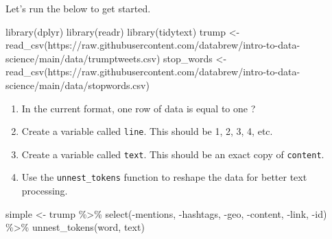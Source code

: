 \documentclass[
]{book}
\newenvironment{Shaded}{\begin{snugshade}}{\end{snugshade}}
\newcommand{\FunctionTok}[1]{\textcolor[rgb]{0.00,0.00,0.00}{#1}}
\newcommand{\NormalTok}[1]{#1}
\newcommand{\OtherTok}[1]{\textcolor[rgb]{0.56,0.35,0.01}{#1}}
\newcommand{\SpecialCharTok}[1]{\textcolor[rgb]{0.00,0.00,0.00}{#1}}
\newcommand{\StringTok}[1]{\textcolor[rgb]{0.31,0.60,0.02}{#1}}
\begin{document}
Let's run the below to get started.

\begin{Shaded}
\begin{Highlighting}[]

\FunctionTok{library}\NormalTok{(dplyr)}
\FunctionTok{library}\NormalTok{(readr)}
\FunctionTok{library}\NormalTok{(tidytext)}
\NormalTok{trump }\OtherTok{\textless{}{-}} \FunctionTok{read\_csv}\NormalTok{(}\StringTok{\textquotesingle{}https://raw.githubusercontent.com/databrew/intro{-}to{-}data{-}science/main/data/trumptweets.csv\textquotesingle{}}\NormalTok{)}
\NormalTok{stop\_words }\OtherTok{\textless{}{-}} \FunctionTok{read\_csv}\NormalTok{(}\StringTok{\textquotesingle{}https://raw.githubusercontent.com/databrew/intro{-}to{-}data{-}science/main/data/stopwords.csv\textquotesingle{}}\NormalTok{)}
\end{Highlighting}
\end{Shaded}

\begin{enumerate}
\def\labelenumi{\arabic{enumi}.}
\item
  In the current format, one row of data is equal to one ?
\item
  Create a variable called \texttt{line}. This should be 1, 2, 3, 4, etc.
\item
  Create a variable called \texttt{text}. This should be an exact copy of \texttt{content}.
\item
  Use the \texttt{unnest\_tokens} function to reshape the data for better text processing.
\end{enumerate}

\begin{Shaded}
\begin{Highlighting}[]
\NormalTok{simple }\OtherTok{\textless{}{-}}\NormalTok{ trump }\SpecialCharTok{\%\textgreater{}\%}
  \FunctionTok{select}\NormalTok{(}\SpecialCharTok{{-}}\NormalTok{mentions, }\SpecialCharTok{{-}}\NormalTok{hashtags, }\SpecialCharTok{{-}}\NormalTok{geo, }\SpecialCharTok{{-}}\NormalTok{content, }\SpecialCharTok{{-}}\NormalTok{link, }\SpecialCharTok{{-}}\NormalTok{id) }\SpecialCharTok{\%\textgreater{}\%}
  \FunctionTok{unnest\_tokens}\NormalTok{(word, text)}
\end{Highlighting}
\end{Shaded}
\end{document}
